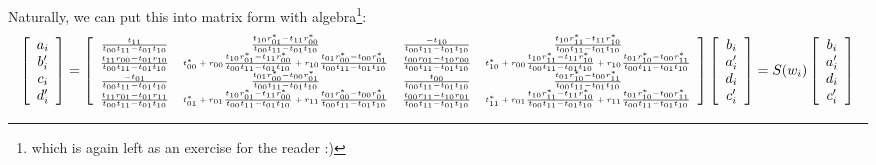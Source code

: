 \documentclass[10pt, letter, oneside,graphicx]{article}
\begin{document}
Naturally, we can put this into matrix form with algebra\footnote{which is again left as an exercise for the reader :)}:
\begin{align*}
\left[ \begin{array}{c}
a_i \\ b_i' \\ c_i \\ d_i'
\end{array} \right]
=
{\tiny
\left[ \begin{array}{cccc}
    \frac{t_{11}}{t_{00}t_{11} - t_{01}t_{10}} &
    \frac{t_{10}r_{01}^* - t_{11}r_{00}^*}{t_{00}t_{11} - t_{01}t_{10}} &
    \frac{-t_{10}}{t_{00}t_{11} - t_{01}t_{10}} &
    \frac{t_{10}r_{11}^* - t_{11}r_{10}^*}{t_{00}t_{11} - t_{01}t_{10}}
\\
    \frac{t_{11}r_{00} - t_{01}r_{10}}{t_{00}t_{11} - t_{01}t_{10}} &
    t_{00}^* + r_{00}\frac{t_{10}r_{01}^* - t_{11}r_{00}^*}{t_{00}t_{11} - t_{01}t_{10}} + r_{10}\frac{t_{01}r_{00}^* - t_{00}r_{01}^*}{t_{00}t_{11} - t_{01}t_{10}} &
    \frac{t_{00}r_{01} - t_{10}r_{00}}{t_{00}t_{11} - t_{01}t_{10}} &
    t_{10}^* + r_{00}\frac{t_{10}r_{11}^* - t_{11}r_{10}^*}{t_{00}t_{11} - t_{01}t_{10}} + r_{10}\frac{t_{01}r_{10}^* - t_{00}r_{11}^*}{t_{00}t_{11} - t_{01}t_{10}}
\\
    \frac{-t_{01}}{t_{00}t_{11} - t_{01}t_{10}} &
    \frac{t_{01}r_{00}^* - t_{00}r_{01}^*}{t_{00}t_{11} - t_{01}t_{10}} &
    \frac{t_{00}}{t_{00}t_{11} - t_{01}t_{10}} &
    \frac{t_{01}r_{10}^* - t_{00}r_{11}^*}{t_{00}t_{11} - t_{01}t_{10}}
\\
    \frac{t_{11}r_{01} - t_{01}r_{11}}{t_{00}t_{11} - t_{01}t_{10}} &
    t_{01}^* + r_{01}\frac{t_{10}r_{01}^* - t_{11}r_{00}^*}{t_{00}t_{11} - t_{01}t_{10}} + r_{11}\frac{t_{01}r_{00}^* - t_{00}r_{01}^*}{t_{00}t_{11} - t_{01}t_{10}} &
    \frac{t_{00}r_{11} - t_{10}r_{01}}{t_{00}t_{11} - t_{01}t_{10}} &
    t_{11}^* + r_{01}\frac{t_{10}r_{11}^* - t_{11}r_{10}^*}{t_{00}t_{11} - t_{01}t_{10}} + r_{11}\frac{t_{01}r_{10}^* - t_{00}r_{11}^*}{t_{00}t_{11} - t_{01}t_{10}}
\end{array} \right]}
\left[ \begin{array}{c}
b_i \\ a_i' \\ d_i \\ c_i'
\end{array} \right]
=
S(w_i)
\left[ \begin{array}{c}
b_i \\ a_i' \\ d_i \\ c_i'
\end{array} \right]
\end{align*}
\end{document}
